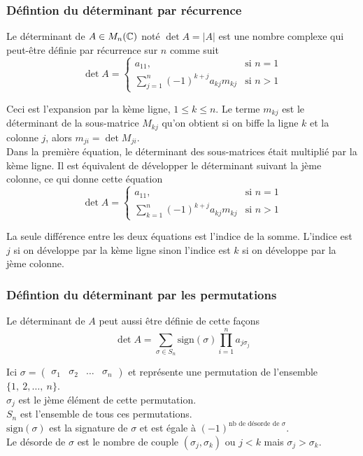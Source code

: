 \subsubsection{Défintion du déterminant par récurrence}
\begin{definition}
    Le déterminant de $A \in M_n(\mathbb{C})$ noté $\det A = |A|$ est une nombre complexe
    qui peut-être définie par récurrence sur $n$ comme suit \[
        \det A = \begin{cases}
            a_{11},                                   & \text{si } n = 1 \\
            \sum_{j = 1}^{n} (-1)^{k + j}a_{kj}m_{kj} & \text{si } n > 1
        \end{cases}
    \]
\end{definition}
\noindent
Ceci est l'expansion par la kème ligne, $1 \leq k \leq n$. Le terme $m_{kj}$
est le déterminant de la sous-matrice $M_{kj}$ qu'on obtient si on biffe la ligne $k$ et la
colonne $j$, alors $m_{ji} = \det M_{ji}$. \\
Dans la première équation, le déterminant des sous-matrices était multiplié par la kème ligne. Il est
équivalent de développer le déterminant suivant la jème colonne, ce qui donne cette équation \[
    \det A = \begin{cases}
        a_{11},                                   & \text{si } n = 1 \\
        \sum_{k = 1}^{n} (-1)^{k + j}a_{kj}m_{kj} & \text{si } n > 1
    \end{cases}
\]
\begin{remark}
    La seule différence entre les deux équations est l'indice de la somme. L'indice est $j$ si on
    développe par la kème ligne sinon l'indice est $k$ si on développe par la jème colonne.
\end{remark}

\subsubsection{Défintion du déterminant par les permutations}
\begin{definition}
    Le déterminant de $A$ peut aussi être définie de cette façons \begin{equation*}
        \det A = \sum_{\sigma \in S_n} \text{sign}(\sigma) \prod_{i = 1}^{n}a_{j \sigma_j}
    \end{equation*}
\end{definition}
\noindent
Ici $\sigma = \begin{pmatrix}
        \sigma_1 & \sigma_2 & \dots & \sigma_n
    \end{pmatrix}$ et représente une permutation de l'ensemble $\{1, \ 2, \dots, \ n  \}$. \\
$\sigma_j$ est le jème élément de cette permutation. \\
$S_n$ est l'ensemble de tous ces permutations. \\
$\text{sign}(\sigma)$ est la signature de $\sigma$ et est égale à $(-1)^{\text{nb de désorde de } \sigma}$. \\
Le désorde de $\sigma$ est le nombre de couple $(\sigma_j, \sigma_k)$ ou $j < k$ mais $\sigma_j > \sigma_k$.

